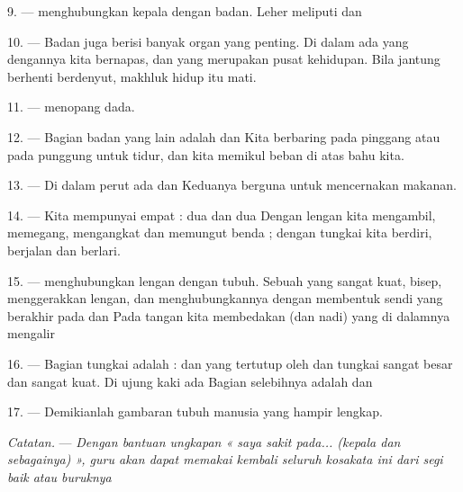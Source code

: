 9. ---  menghubungkan kepala dengan badan. Leher
meliputi  dan 

10. --- Badan juga berisi banyak organ yang penting. Di dalam
 ada  yang dengannya kita bernapas,
dan  yang merupakan pusat kehidupan. Bila jantung
berhenti berdenyut, makhluk hidup itu mati.

11. ---  menopang dada.

12. --- Bagian badan yang lain adalah 
  dan  Kita berbaring
pada pinggang atau pada punggung untuk tidur, dan kita memikul beban
di atas bahu kita.

13. --- Di dalam perut ada  dan 
Keduanya berguna untuk mencernakan makanan.

\VUsaut{4.4mm}
\VUsaut{3.0mm}

14. --- Kita mempunyai empat  : dua
 dan dua  Dengan lengan kita
mengambil, memegang, mengangkat dan memungut benda ; dengan tungkai
kita berdiri, berjalan dan berlari.

15. ---  menghubungkan lengan dengan tubuh. Sebuah
 yang sangat kuat, bisep, menggerakkan lengan, dan
 menghubungkannya dengan 
 membentuk sendi  yang berakhir
pada  dan  Pada tangan kita
membedakan  (dan nadi) yang di dalamnya mengalir

16. --- Bagian tungkai adalah :   dan
  yang 
tertutup oleh   dan 
 tungkai sangat besar dan sangat kuat. Di ujung kaki
ada  Bagian selebihnya adalah 
dan 

17. --- Demikianlah gambaran tubuh manusia yang hampir lengkap.

\textit{Catatan.} --- \textit{Dengan bantuan ungkapan « saya sakit
pada... (kepala dan sebagainya) », guru akan dapat memakai kembali
seluruh kosakata ini dari segi baik atau buruknya} 

